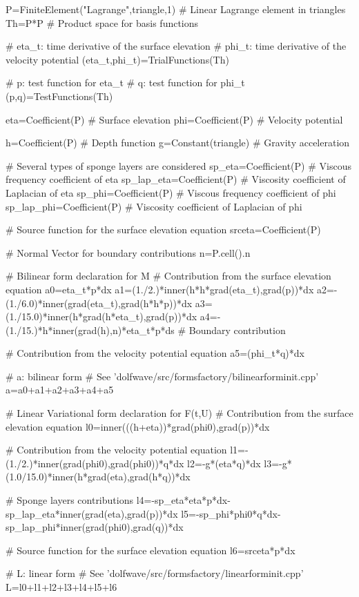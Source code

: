 \begin{python}
P=FiniteElement("Lagrange",triangle,1) # Linear Lagrange element in triangles
Th=P*P # Product space for basis functions

# eta_t: time derivative of the surface elevation
# phi_t: time derivative of the velocity potential
(eta_t,phi_t)=TrialFunctions(Th)

# p: test function for eta_t
# q: test function for phi_t
(p,q)=TestFunctions(Th)

eta=Coefficient(P) # Surface elevation
phi=Coefficient(P) # Velocity potential

h=Coefficient(P) # Depth function
g=Constant(triangle) # Gravity acceleration

# Several types of sponge layers are considered
sp_eta=Coefficient(P) # Viscous frequency coefficient of eta
sp_lap_eta=Coefficient(P) # Viscosity coefficient of Laplacian of eta
sp_phi=Coefficient(P) # Viscous frequency coefficient of phi
sp_lap_phi=Coefficient(P) # Viscosity coefficient of Laplacian of phi

# Source function for the surface elevation equation
srceta=Coefficient(P)

# Normal Vector for boundary contributions
n=P.cell().n

# Bilinear form declaration for M
# Contribution from the surface elevation equation
a0=eta_t*p*dx
a1=(1./2.)*inner(h*h*grad(eta_t),grad(p))*dx
a2=-(1./6.0)*inner(grad(eta_t),grad(h*h*p))*dx
a3=(1./15.0)*inner(h*grad(h*eta_t),grad(p))*dx
a4=-(1./15.)*h*inner(grad(h),n)*eta_t*p*ds # Boundary contribution

# Contribution from the velocity potential equation
a5=(phi_t*q)*dx

# a: bilinear form
# See 'dolfwave/src/formsfactory/bilinearforminit.cpp'
a=a0+a1+a2+a3+a4+a5

# Linear Variational form declaration for F(t,U)
# Contribution from the surface elevation equation
l0=inner(((h+eta))*grad(phi0),grad(p))*dx

# Contribution from the velocity potential equation
l1=-(1./2.)*inner(grad(phi0),grad(phi0))*q*dx
l2=-g*(eta*q)*dx
l3=-g*(1.0/15.0)*inner(h*grad(eta),grad(h*q))*dx

# Sponge layers contributions
l4=-sp_eta*eta*p*dx-sp_lap_eta*inner(grad(eta),grad(p))*dx
l5=-sp_phi*phi0*q*dx-sp_lap_phi*inner(grad(phi0),grad(q))*dx

# Source function for the surface elevation equation
l6=srceta*p*dx

# L: linear form
# See 'dolfwave/src/formsfactory/linearforminit.cpp'
L=l0+l1+l2+l3+l4+l5+l6
\end{python}

